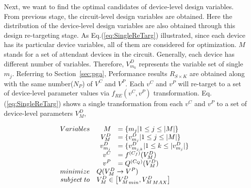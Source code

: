     Next, we want to find the optimal candidates of device-level design variables. From previous stage, the circuit-level design variables are obtained. Here the distribution of the device-level design variables are also obtained through this design re-targeting stage. As Eq.(\ref{eq:SingleReTarg}) illustrated, since each device has its particular device variables, all of them are considered for optimization. $M$ stands for a set of attendant devices in the circuit. Generally, each device has different number of variables. Therefore, $V^D_{m_k}$ represents the variable set of single $m_j$. Referring to Section~\ref{sec:pga}, Performance results $R_{S \times K}$ are obtained along with the same number($N_P$) of $V^C$ and $V^P$. Each $v^C$ and $v^P$ will re-target to a set of device-level parameter values via $f_{RE}(v^C, v^P)$ transformation. Eq.(\ref{eq:SingleReTarg}) shows a single transformation from each $v^C$ and $v^P$ to a set of device-level parameters $V^D_M$,

    \begin{align}{\label{eq:SingleReTarg}}
      \begin{array}[t]{rl}
        Variables & \begin{array}[t]{rl}
                      M         &= \{ m_j| 1 \leq j \leq |M|\} \\
                      V^D_M     &= \{ v^D_{m_j} | 1 \leq j \leq |M|\} \\
                      v^D_{m_j} &= \{v^D_{m_{j,k}}| 1 \leq k \leq |v^D_{m_j}|\}\\
                      v^C       &= f^{(C_f)}(V^D_M)\\
                      v^P       &= Q^{(C_Q)}(V^D_M)\\
                    \end{array} \\
         minimize & Q(V^D_M \to V^P)  \\
       subject\; to & V^D_M\in \left [{V^D_M}_{min}, {V^D_M}_{MAX} \right] 
      \end{array} 
    \end{align}

